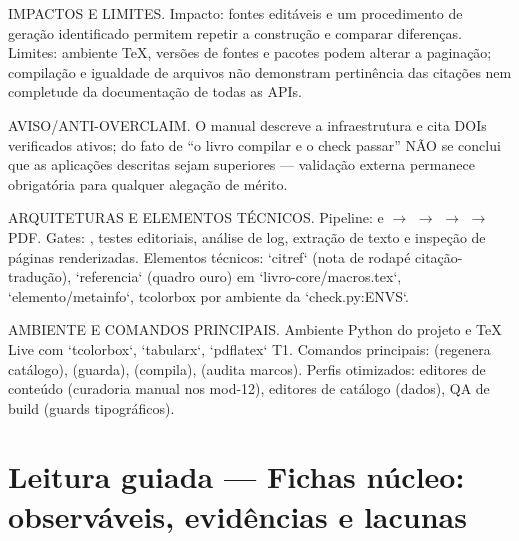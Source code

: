 \begin{limite}
IMPACTOS E LIMITES. Impacto: fontes editáveis e um procedimento de geração
identificado permitem repetir a construção e comparar diferenças. Limites:
ambiente TeX, versões de fontes e pacotes podem alterar a paginação;
compilação e igualdade de arquivos não demonstram pertinência das citações
nem completude da documentação de todas as APIs.
\end{limite}

\begin{aviso}
AVISO/ANTI-OVERCLAIM. O manual descreve a infraestrutura e cita DOIs
verificados ativos; do fato de ``o livro compilar e o check passar'' NÃO se
conclui que as aplicações descritas sejam superiores — validação externa
permanece obrigatória para qualquer alegação de mérito.
\end{aviso}

\begin{arquitetura}
ARQUITETURAS E ELEMENTOS TÉCNICOS. Pipeline:  e
 $\rightarrow$  $\rightarrow$
 $\rightarrow$  $\rightarrow$ PDF.
Gates: , testes editoriais, análise de log, extração de texto
e inspeção de páginas renderizadas. Elementos técnicos:
`citref` (nota de rodapé citação-tradução), `referencia` (quadro ouro) em
`livro-core/macros.tex`, `elemento/metainfo`, tcolorbox por ambiente da
`check.py:ENVS`.
\end{arquitetura}

\begin{processo}
AMBIENTE E COMANDOS PRINCIPAIS. Ambiente Python do projeto e TeX Live com
`tcolorbox`, `tabularx`, `pdflatex` T1. Comandos principais:
 (regenera catálogo),  (guarda),
 (compila),  (audita marcos).
Perfis otimizados: editores de conteúdo (curadoria manual nos mod-12),
editores de catálogo (dados), QA de build (guards tipográficos).
\end{processo}



\section[Leitura guiada]{Leitura guiada — Fichas núcleo: observáveis, evidências e lacunas}

